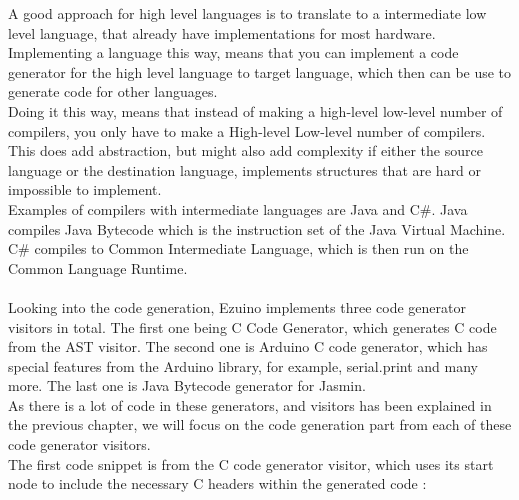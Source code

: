 A good approach for high level languages is to translate to a intermediate low level language, that already have implementations for most hardware.\\
Implementing a language this way, means that you can implement a code generator for the high level language to target language, which then can be use to generate code for other languages.\\
Doing it this way, means that instead of making a high-level \* low-level number of compilers, you only have to make a High-level \+ Low-level number of compilers.\\
This does add abstraction, but might also add complexity if either the source language or the destination language, implements structures that are hard or impossible to implement.\\
Examples of compilers with intermediate languages are Java and C\#. Java compiles Java Bytecode which is the instruction set of the Java Virtual Machine. C\# compiles to Common Intermediate Language, which is then run on the Common Language Runtime.
\\\\
Looking into the code generation, Ezuino implements three code generator visitors in total. The first one being C Code Generator, which generates C code from the AST visitor. The second one is Arduino C code generator, which has special features from the Arduino library, for example, serial.print and many more. The last one is Java Bytecode generator for Jasmin.\\
As there is a lot of code in these generators, and visitors has been explained in the previous chapter, we will focus on the code generation part from each of these code generator visitors.\\
The first code snippet is from the C code generator visitor, which uses its start node to include the necessary C headers within the generated code : \\

\noindent\newline

